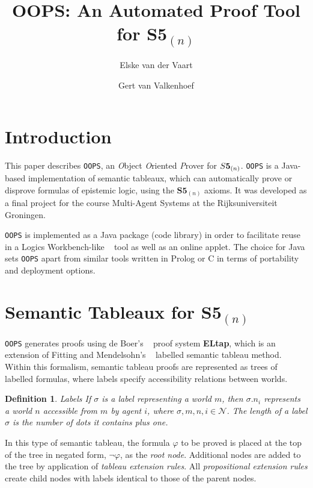\documentclass[11pt,a4paper]{article}
\author{Elske van der Vaart \and Gert van Valkenhoef}
\title{OOPS: An Automated Proof Tool for $\textbf{S5}_{(n)}$}
\newtheorem{defs}{Definition}[section]
\begin{document}
\maketitle

\section{Introduction}

This paper describes {\tt OOPS}, an {\it O}bject {\it O}riented {\it P}rover for $\mathbf\mathit{S}\textbf{5}_{(n)}$. {\tt OOPS} is a Java-based implementation of semantic tableaux, which can automatically prove or disprove  formulas of epistemic logic, using the $\textbf{S5}_{(n)}$ axioms. It was developed as a final project for the course Multi-Agent Systems at the Rijksuniversiteit Groningen.
\par {\tt OOPS} is implemented as a Java package (code library) in order to facilitate reuse in a Logics Workbench-like ~\cite{wb} tool as well as an online applet. The choice for Java sets {\tt OOPS} apart from similar tools written in Prolog or C in terms of portability and deployment options.

\section{Semantic Tableaux for $\textbf{S5}_{(n)}$}
\label{theory}
{\tt OOPS} generates proofs using de Boer's ~\cite{these} proof system {\bf ELtap}, which is an extension of Fitting and Mendelsohn's ~\cite{fit_men} labelled semantic tableau method. Within this formalism, semantic tableau proofs are represented as trees of labelled formulas, where labels specify accessibility relations between worlds.

\begin{defs}{\it Labels} \newline
If $\sigma$ is a label representing a world $m$, then $\sigma.n_i$ represents a world $n$ accessible from $m$ by agent $i$, where $\sigma,m,n,i \in \mathcal{N}$. The {\it length} of a label $\sigma$ is the number of dots it contains plus one.~\cite{beck_gore} \end{defs} 

In this type of semantic tableau, the formula $\varphi$ to be proved is placed at the top of the tree in negated form, $\neg \varphi$, as the {\it root node}. Additional nodes are added to the tree by application of {\it tableau extension rules}. All {\it propositional extension rules} create child nodes with labels identical to those of the parent nodes.
\end{document}

